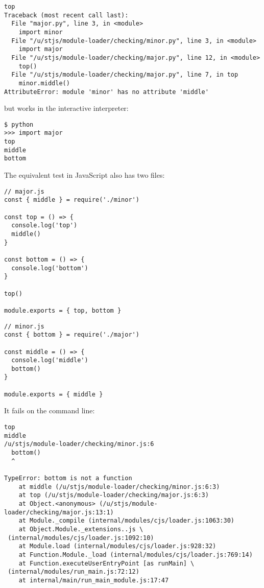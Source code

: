 \documentclass[krantzl]{krantz}
\begin{document}
\begin{lstlisting}[frame=single,frameround=tttt]
top
Traceback (most recent call last):
  File "major.py", line 3, in <module>
    import minor
  File "/u/stjs/module-loader/checking/minor.py", line 3, in <module>
    import major
  File "/u/stjs/module-loader/checking/major.py", line 12, in <module>
    top()
  File "/u/stjs/module-loader/checking/major.py", line 7, in top
    minor.middle()
AttributeError: module 'minor' has no attribute 'middle'
\end{lstlisting}



\noindent but works in the interactive interpreter:


\begin{lstlisting}[frame=single,frameround=tttt]
$ python
>>> import major
top
middle
bottom
\end{lstlisting}



The equivalent test in JavaScript also has two files:


\begin{lstlisting}[frame=single,frameround=tttt]
// major.js
const { middle } = require('./minor')

const top = () => {
  console.log('top')
  middle()
}

const bottom = () => {
  console.log('bottom')
}

top()

module.exports = { top, bottom }
\end{lstlisting}



\begin{lstlisting}[frame=single,frameround=tttt]
// minor.js
const { bottom } = require('./major')

const middle = () => {
  console.log('middle')
  bottom()
}

module.exports = { middle }
\end{lstlisting}



\noindent It fails on the command line:


\begin{lstlisting}[frame=single,frameround=tttt]
top
middle
/u/stjs/module-loader/checking/minor.js:6
  bottom()
  ^

TypeError: bottom is not a function
    at middle (/u/stjs/module-loader/checking/minor.js:6:3)
    at top (/u/stjs/module-loader/checking/major.js:6:3)
    at Object.<anonymous> (/u/stjs/module-loader/checking/major.js:13:1)
    at Module._compile (internal/modules/cjs/loader.js:1063:30)
    at Object.Module._extensions..js \
 (internal/modules/cjs/loader.js:1092:10)
    at Module.load (internal/modules/cjs/loader.js:928:32)
    at Function.Module._load (internal/modules/cjs/loader.js:769:14)
    at Function.executeUserEntryPoint [as runMain] \
 (internal/modules/run_main.js:72:12)
    at internal/main/run_main_module.js:17:47
\end{lstlisting}
\end{document}
